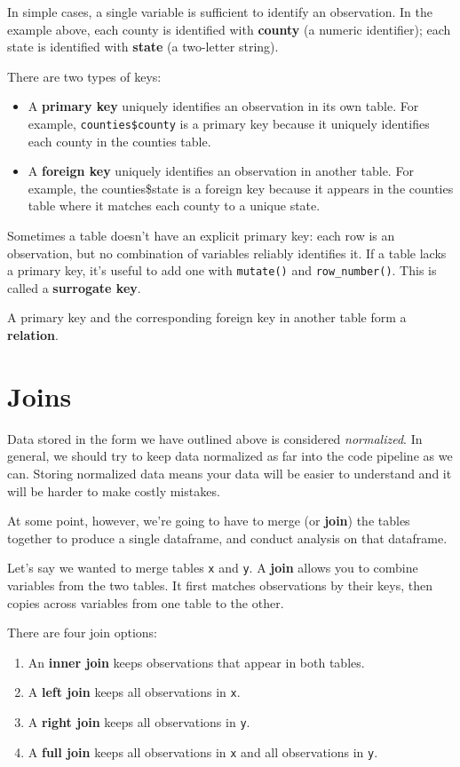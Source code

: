 \documentclass[]{book}
\providecommand{\tightlist}{%
  \setlength{\itemsep}{0pt}\setlength{\parskip}{0pt}}
\begin{document}
In simple cases, a single variable is sufficient to identify an
observation. In the example above, each county is identified with
\textbf{county} (a numeric identifier); each state is identified with
\textbf{state} (a two-letter string).

There are two types of keys:

\begin{itemize}
\item
  A \textbf{primary key} uniquely identifies an observation in its own
  table. For example, \texttt{counties\$county} is a primary key because
  it uniquely identifies each county in the counties table.
\item
  A \textbf{foreign key} uniquely identifies an observation in another
  table. For example, the counties\$state is a foreign key because it
  appears in the counties table where it matches each county to a unique
  state.
\end{itemize}

Sometimes a table doesn't have an explicit primary key: each row is an
observation, but no combination of variables reliably identifies it. If
a table lacks a primary key, it's useful to add one with
\texttt{mutate()} and \texttt{row\_number()}. This is called a
\textbf{surrogate key}.

A primary key and the corresponding foreign key in another table form a
\textbf{relation}.

\section{Joins}\label{joins}

Data stored in the form we have outlined above is considered
\emph{normalized}. In general, we should try to keep data normalized as
far into the code pipeline as we can. Storing normalized data means your
data will be easier to understand and it will be harder to make costly
mistakes.

At some point, however, we're going to have to merge (or \textbf{join})
the tables together to produce a single dataframe, and conduct analysis
on that dataframe.

Let's say we wanted to merge tables \texttt{x} and \texttt{y}. A
\textbf{join} allows you to combine variables from the two tables. It
first matches observations by their keys, then copies across variables
from one table to the other.

There are four join options:

\begin{enumerate}
\def\labelenumi{\arabic{enumi}.}
\tightlist
\item
  An \textbf{inner join} keeps observations that appear in both tables.
\item
  A \textbf{left join} keeps all observations in \texttt{x}.
\item
  A \textbf{right join} keeps all observations in \texttt{y}.
\item
  A \textbf{full join} keeps all observations in \texttt{x} and all
  observations in \texttt{y}.
\end{enumerate}
\end{document}

